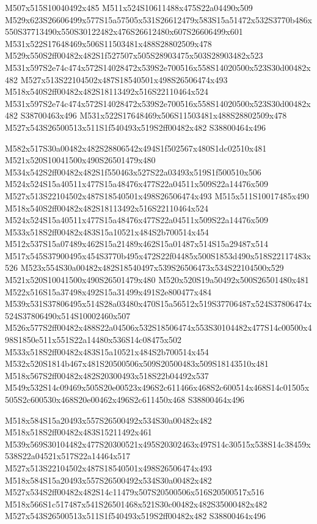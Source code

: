 \documentclass{article}
\begin{document}
\begin{multicols}{2}
M507x515S10040492x485 M511x524S10611488x475S22a04490x509 M529x623S26606499x577S15a57505x531S26612479x583S15a51472x532S3770b486x550S37713490x550S30122482x476S26612480x607S26606499x601 M531x522S17648469x506S11503481x488S28802509x478 M529x550S2ff00482x482S1f527507x505S28903475x503S28903482x523 M531x597S2e74c474x572S14028472x539S2e700516x558S14020500x523S30d00482x482 M527x513S22104502x487S18540501x498S26506474x493 M518x540S2ff00482x482S18113492x516S22110464x524 M531x597S2e74c474x572S14028472x539S2e700516x558S14020500x523S30d00482x482 S38700463x496 M531x522S17648469x506S11503481x488S28802509x478 M527x543S26500513x511S1f540493x519S2ff00482x482 S38800464x496

M582x517S30a00482x482S28806542x494S1f502567x480S1dc02510x481 M521x520S10041500x490S26501479x480 M534x542S2ff00482x482S1f550463x527S22a03493x519S1f500510x506 M524x524S15a40511x477S15a48476x477S22a04511x509S22a14476x509 M527x513S22104502x487S18540501x498S26506474x493 M515x511S10017485x490 M518x540S2ff00482x482S18113492x516S22110464x524 M524x524S15a40511x477S15a48476x477S22a04511x509S22a14476x509 M533x518S2ff00482x483S15a10521x484S2b700514x454 M512x537S15a07489x462S15a21489x462S15a01487x514S15a29487x514 M517x545S37900495x454S3770b495x472S22f04485x500S1853d490x518S22117483x526 M523x554S30a00482x482S18540497x539S26506473x534S22104500x529 M521x520S10041500x490S26501479x480 M520x520S19a50492x500S26501480x481 M522x516S15a37498x492S15a31499x491S2e800477x484 M539x531S37806495x514S28a03480x470S15a56512x519S37706487x524S37806474x524S37806490x514S10002460x507 M526x577S2ff00482x488S22a04506x532S18506474x553S30104482x477S14c00500x498S1850e511x551S22a14480x536S14c08475x502 M533x518S2ff00482x483S15a10521x484S2b700514x454 M532x520S1814b467x481S20500506x509S20500483x509S18143510x481 M518x567S2ff00482x482S20300493x518S22b04492x537 M549x532S14c09469x505S20e00523x496S2c611466x468S2c600514x468S14c01505x505S2c600530x468S20e00462x496S2c611450x468 S38800464x496

M518x584S15a20493x557S26500492x534S30a00482x482 M518x518S2ff00482x483S15211492x461 M539x569S30104482x477S20300521x495S20302463x497S14c30515x538S14c38459x538S22a04521x517S22a14464x517 M527x513S22104502x487S18540501x498S26506474x493 M518x584S15a20493x557S26500492x534S30a00482x482 M527x534S2ff00482x482S14c11479x507S20500506x516S20500517x516 M518x566S1c517487x541S26501468x521S30c00482x482S35000482x482 M527x543S26500513x511S1f540493x519S2ff00482x482 S38800464x496


\end{multicols}
\end{document}
